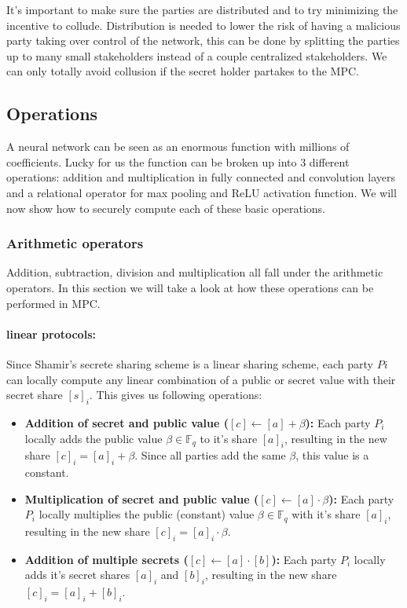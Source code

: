 It's important to make sure the parties are distributed and to try minimizing the incentive to collude. Distribution is needed to lower the risk of having a malicious party taking over control of the network, this can be done by splitting the parties up to many small stakeholders instead of a couple centralized stakeholders. We can only totally avoid collusion if the secret holder partakes to the MPC.

\subsection{Operations}
A neural network can be seen as an enormous function with millions of coefficients. Lucky for us the function can be broken up into 3 different operations: addition and multiplication in fully connected and convolution layers and a relational operator for max pooling and ReLU activation function. We will now show how to securely compute each of these basic operations.

\subsubsection{Arithmetic operators}
Addition, subtraction, division and multiplication all fall under the arithmetic operators. In this section we will take a look at how these operations can be performed in MPC.
\paragraph{linear protocols:}
Since Shamir's secrete sharing scheme is a linear sharing scheme, each party $Pi$ can locally compute any linear combination of a public or secret value with their secret share $[s]_i$. This gives us following operations:
\begin{itemize}
  \item \textbf{Addition of secret and public value ($[c] \gets [a] + \beta$):} Each party $P_i$ locally adds the public value $\beta \in \mathbb{F}_q$ to it's share $[a]_i$, resulting in the new share $[c]_i = [a]_i + \beta$. Since all parties add the same $\beta$, this value is a constant.
  \item \textbf{Multiplication of secret and public value ($[c] \gets [a] \cdot \beta$):} Each party $P_i$ locally multiplies the public (constant) value $\beta \in \mathbb{F}_q$ with it's share $[a]_i$, resulting in the new share $[c]_i = [a]_i \cdot \beta$.
  \item \textbf{Addition of multiple secrets ($[c] \gets [a] \cdot [b]$):} Each party $P_i$ locally adds it's secret shares $[a]_i$ and $[b]_i$, resulting in the new share $[c]_i = [a]_i + [b]_i$.
\end{itemize}

